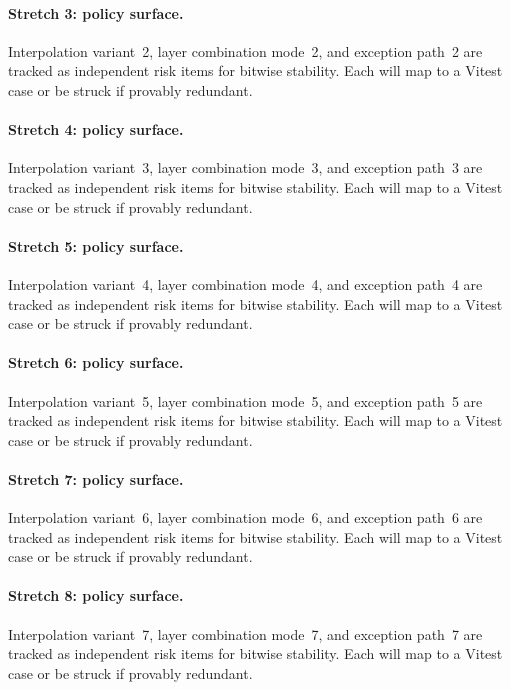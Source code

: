 \documentclass[sigconf,nonacm]{acmart}
\begin{document}
\paragraph{Stretch 3: policy surface.}
Interpolation variant~2, layer combination mode~2, and exception path~2 are tracked as independent risk items for bitwise stability. Each will map to a Vitest case or be struck if provably redundant. %

\paragraph{Stretch 4: policy surface.}
Interpolation variant~3, layer combination mode~3, and exception path~3 are tracked as independent risk items for bitwise stability. Each will map to a Vitest case or be struck if provably redundant. %

\paragraph{Stretch 5: policy surface.}
Interpolation variant~4, layer combination mode~4, and exception path~4 are tracked as independent risk items for bitwise stability. Each will map to a Vitest case or be struck if provably redundant. %

\paragraph{Stretch 6: policy surface.}
Interpolation variant~5, layer combination mode~5, and exception path~5 are tracked as independent risk items for bitwise stability. Each will map to a Vitest case or be struck if provably redundant. %

\paragraph{Stretch 7: policy surface.}
Interpolation variant~6, layer combination mode~6, and exception path~6 are tracked as independent risk items for bitwise stability. Each will map to a Vitest case or be struck if provably redundant. %

\paragraph{Stretch 8: policy surface.}
Interpolation variant~7, layer combination mode~7, and exception path~7 are tracked as independent risk items for bitwise stability. Each will map to a Vitest case or be struck if provably redundant. %
\end{document}
